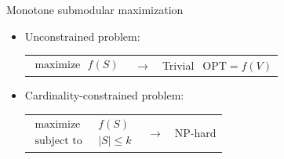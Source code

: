 \documentclass[xetex,10pt,mathserif]{beamer}
\begin{document}
\renewcommand{\tabularxcolumn}[1]{>{\small}m{#1}}
\begin{frame}{Monotone submodular maximization}
\begin{itemize}
\item Unconstrained problem:\\
\begin{tabularx}{3in}{XcX}
{\begin{align*}\textrm{maximize}\ \ \ f(S)\end{align*}} & $\longrightarrow$ & {\color{green!50!darkgray}Trivial} $\ \ \textrm{OPT} = f(V)$
\end{tabularx}
\vspace{2em}
\item Cardinality-constrained problem:\\
\begin{tabularx}{3in}{XcX}
{\begin{align*}\textrm{maximize}\ \ \ &f(S)\\ \textrm{subject to}\ \ \ &|S| \leq k\end{align*}} & $\longrightarrow$ & \color{red!80!darkgray} NP-hard
\end{tabularx}
\end{itemize}
\end{frame}
\end{document}
